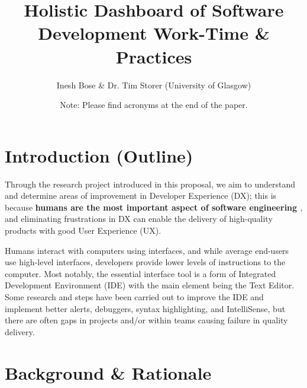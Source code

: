 \documentclass{prrcs}
\title{%
    \vspace{-0.75cm}%
    Holistic Dashboard of Software\\Development Work-Time \& Practices%
}
\author{%
    \vspace{-0.5cm}%
    Inesh Bose \& Dr. Tim Storer (University of Glasgow)%
}
\date{%
    \footnotesize{Note: Please find acronyms at the end of the paper.}%
    \vspace{0.5cm}%
}
\begin{document}
\maketitle

\section{Introduction (Outline)}

Through the research project introduced in this proposal, we aim to understand and determine areas of improvement in Developer Experience (DX); this is because \textbf{humans are the most important aspect of software engineering \cite{martinAgileSoftwareDevelopment2003}}, and eliminating frustrations in DX can enable the delivery of high-quality products \cite{sommervilleSoftwareEngineering1992} with good User Experience (UX).

Humans interact with computers using interfaces, and while average end-users use high-level interfaces, developers provide lower levels of instructions to the computer. Most notably, the essential interface tool is a form of Integrated Development Environment (IDE) with the main element being the Text Editor. Some research and steps have been carried out to improve the IDE and implement better alerts, debuggers, syntax highlighting, and IntelliSense, but there are often gaps in projects and/or within teams causing failure in quality delivery.

\section{Background \& Rationale}
\end{document}
